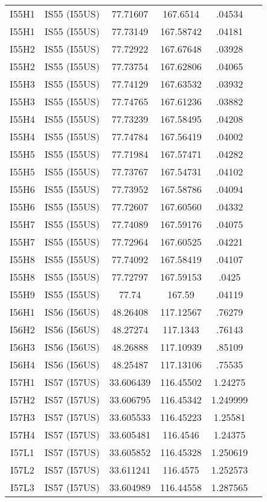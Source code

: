 \documentclass[a4paper, 10pt]{report}
\begin{document}
{\begin{center}
\begin{tabular}{|c|c|c|c|c|c|}
I55H1&	IS55 (I55US)&	 	77.71607&	167.6514&	.04534\\
I55H1&	IS55 (I55US)&	 	77.73149&	167.58742&	.04181\\
I55H2&	IS55 (I55US)&	 	77.72922&	167.67648&	.03928\\
I55H2&	IS55 (I55US)&	 	77.73754&	167.62806&	.04065\\
I55H3&	IS55 (I55US)&	 	77.74129&	167.63532&	.03932\\
I55H3&	IS55 (I55US)&	 	77.74765&	167.61236&	.03882\\
I55H4&	IS55 (I55US)&	 	77.73239&	167.58495&	.04208\\
I55H4&	IS55 (I55US)&	 	77.74784&	167.56419&	.04002\\
I55H5&	IS55 (I55US)&	 	77.71984&	167.57471&	.04282\\
I55H5&	IS55 (I55US)&	 	77.73767&	167.54731&	.04102\\
I55H6&	IS55 (I55US)&	 	77.73952&	167.58786&	.04094\\
I55H6&	IS55 (I55US)&	 	77.72607&	167.60560&	.04332\\
I55H7&	IS55 (I55US)&	 	77.74089&	167.59176&	.04075\\
I55H7&	IS55 (I55US)&	 	77.72964&	167.60525&	.04221\\
I55H8&	IS55 (I55US)&	 	77.74092&	167.58419&	.04107\\
I55H8&	IS55 (I55US)&	 	77.72797&	167.59153&	.0425\\
I55H9&	IS55 (I55US)&	 	77.74&	167.59&	.04119\\
I56H1&	IS56 (I56US)&	 	48.26408&	117.12567&	.76279\\
I56H2&	IS56 (I56US)&	 	48.27274&	117.1343&	.76143\\
I56H3&	IS56 (I56US)&	 	48.26888&	117.10939&	.85109\\
I56H4&	IS56 (I56US)&	 	48.25487&	117.13106&	.75535\\
I57H1&	IS57 (I57US)&	 	33.606439&	116.45502&	1.24275\\
I57H2&	IS57 (I57US)&	 	33.606795&	116.45342&	1.249999\\
I57H3&	IS57 (I57US)&	 	33.605533&	116.45223&	1.25581\\
I57H4&	IS57 (I57US)&	 	33.605481&	116.4546&	1.24375\\
I57L1&	IS57 (I57US)&	 	33.605852&	116.45328&	1.250619\\
I57L2&	IS57 (I57US)&	 	33.611241&	116.4575&	1.252573\\
I57L3&	IS57 (I57US)&	 	33.604989&	116.44558&	1.287565\\

\end{tabular}
\end{center}}
\end{document}

